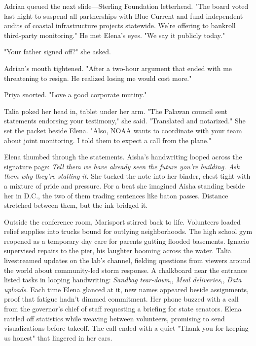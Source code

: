 Adrian queued the next slide—Sterling Foundation letterhead. "The board voted last night to suspend all partnerships with Blue Current and fund independent audits of coastal infrastructure projects statewide. We're offering to bankroll third-party monitoring." He met Elena's eyes. "We say it publicly today."

"Your father signed off?" she asked.

Adrian's mouth tightened. "After a two-hour argument that ended with me threatening to resign. He realized losing me would cost more."

Priya snorted. "Love a good corporate mutiny."

Talia poked her head in, tablet under her arm. "The Palawan council sent statements endorsing your testimony," she said. "Translated and notarized." She set the packet beside Elena. "Also, NOAA wants to coordinate with your team about joint monitoring. I told them to expect a call from the plane."

Elena thumbed through the statements. Aisha's handwriting looped across the signature page: \textit{Tell them we have already seen the future you're building. Ask them why they're stalling it.} She tucked the note into her binder, chest tight with a mixture of pride and pressure. For a beat she imagined Aisha standing beside her in D.C., the two of them trading sentences like baton passes. Distance stretched between them, but the ink bridged it.

\bigskip

Outside the conference room, Marisport stirred back to life. Volunteers loaded relief supplies into trucks bound for outlying neighborhoods. The high school gym reopened as a temporary day care for parents gutting flooded basements. Ignacio supervised repairs to the pier, his laughter booming across the water. Talia livestreamed updates on the lab's channel, fielding questions from viewers around the world about community-led storm response. A chalkboard near the entrance listed tasks in looping handwriting: \textit{Sandbag tear-down,}, \textit{Meal deliveries,}, \textit{Data uploads}. Each time Elena glanced at it, new names appeared beside assignments, proof that fatigue hadn't dimmed commitment. Her phone buzzed with a call from the governor's chief of staff requesting a briefing for state senators. Elena rattled off statistics while weaving between volunteers, promising to send visualizations before takeoff. The call ended with a quiet "Thank you for keeping us honest" that lingered in her ears.

